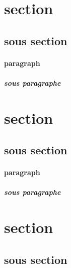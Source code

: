 \documentclass{article}
\begin{document}

\section{section}
\subsection{sous section}
\paragraph{paragraph}
\subparagraph{sous paragraphe}

\section{section}
\subsection{sous section}
\paragraph{paragraph}
\subparagraph{sous paragraphe}

\section{section}
\subsection{sous section}
\end{document}
